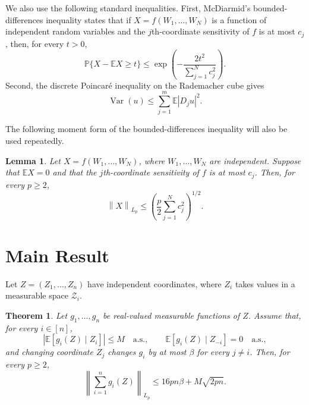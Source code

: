 \documentclass[11pt]{article}
\newtheorem{theorem}{Theorem}
\newtheorem{lemma}{Lemma}
\newcommand{\E}{\mathbb{E}}
\newcommand{\Pp}{\mathbb{P}}
\newcommand{\norm}[1]{\left\lVert #1\right\rVert}
\newcommand{\abs}[1]{\left\lvert #1\right\rvert}
\begin{document}
We also use the following standard inequalities. First, McDiarmid's
bounded-differences inequality \cite{mcdiarmid1989} states that if
$X=f(W_1,\ldots,W_N)$ is a function of independent random variables and the
$j$th-coordinate sensitivity of $f$ is at most $c_j$, then, for every
$t>0$,
\[
\Pp\{X-\E X\ge t\}
\le
\exp\left(
-\frac{2t^2}{\sum_{j=1}^N c_j^2}
\right).
\]
Second, the discrete Poincar\'e inequality on the Rademacher cube
\cite{ledoux2001} gives
\[
\operatorname{Var}(u)
\le
\sum_{j=1}^m
\E\abs{D_j u}^2.
\]

The following moment form of the bounded-differences inequality will also
be used repeatedly.

\begin{lemma}\label{lem:bd}
Let $X=f(W_1,\ldots,W_N)$, where $W_1,\ldots,W_N$ are independent.
Suppose that $\E X=0$ and that the $j$th-coordinate sensitivity of $f$ is
at most $c_j$. Then, for every $p\ge2$,
\[
\norm{X}_{L_p}
\le
\left(
\frac p2\sum_{j=1}^N c_j^2
\right)^{1/2}.
\]
\end{lemma}


\section{Main Result}\label{sec:main}

Let $Z=(Z_1,\ldots,Z_n)$ have independent coordinates, where $Z_i$ takes values in a measurable space $\mathcal Z_i$.

\begin{theorem}\label{thm:product}
Let $g_1,\ldots,g_n$ be real-valued measurable functions of $Z$. Assume that, for every $i\in[n]$,
\[
\abs{\E[g_i(Z)\mid Z_i]}\le M
\quad\text{a.s.},
\qquad
\E[g_i(Z)\mid Z_{-i}]=0
\quad\text{a.s.},
\]
and changing coordinate $Z_j$ changes $g_i$ by at most $\beta$ for every $j\neq i$.
Then, for every $p\ge2$, 
\[
\norm{\sum_{i=1}^n g_i(Z)}_{L_p} \le 16pn\beta+M\sqrt{2pn}.
\]
\end{theorem}

\end{document}
